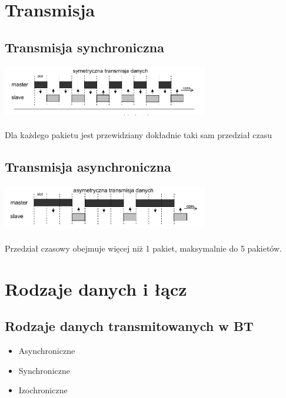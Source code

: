 \section{Transmisja}
\subsection{Transmisja synchroniczna}
\includegraphics[width=9cm]{./wyklady/Rysunek02.pdf}\\\\
Dla każdego pakietu jest przewidziany dokładnie taki sam przedział czasu
\subsection{Transmisja asynchroniczna}
\includegraphics[width=9cm]{./wyklady/Rysunek03.pdf}\\\\
Przedział czasowy obejmuje więcej niż 1 pakiet, maksymalnie do 5 pakietów.

\section{Rodzaje danych i łącz}
\subsection{Rodzaje danych transmitowanych w BT}
\begin{itemize}
	\item Asynchroniczne
	\item Synchroniczne
	\item Izochroniczne
\end{itemize}
